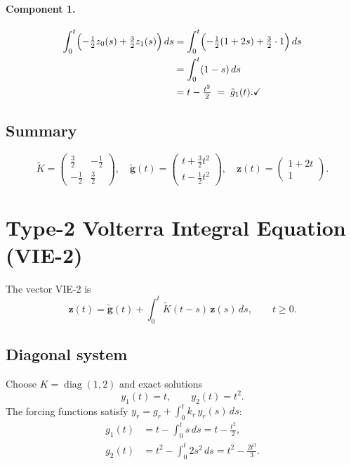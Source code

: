 \documentclass[11pt]{article}
\begin{document}
\paragraph{Component 1.}
\begin{align*}
  \int_0^t \Bigl(-\tfrac{1}{2}z_0(s) + \tfrac{3}{2}z_1(s)\Bigr)\,ds
  &= \int_0^t \Bigl(-\tfrac{1}{2}(1+2s) + \tfrac{3}{2}\cdot 1\Bigr)\,ds \\
  &= \int_0^t (1-s)\,ds \\
  &= t - \tfrac{t^2}{2} \;=\; \tilde{g}_1(t). \checkmark
\end{align*}

\subsection*{Summary}
\[
  \boxed{
    \widetilde{K} = \begin{pmatrix}\tfrac{3}{2}&-\tfrac{1}{2}\\-\tfrac{1}{2}&\tfrac{3}{2}\end{pmatrix},
    \quad
    \widetilde{\mathbf{g}}(t) = \begin{pmatrix}t+\tfrac{3}{2}t^2\\t-\tfrac{1}{2}t^2\end{pmatrix},
    \quad
    \mathbf{z}(t) = \begin{pmatrix}1+2t\\1\end{pmatrix}.
  }
\]

\section{Type-2 Volterra Integral Equation (VIE-2)}

The vector VIE-2 is
\[
  \mathbf{z}(t) = \widetilde{\mathbf{g}}(t)
                + \int_0^t \widetilde{K}(t-s)\,\mathbf{z}(s)\,ds,
  \qquad t\ge 0.
\]

\subsection*{Diagonal system}

Choose $K = \operatorname{diag}(1,2)$ and exact solutions
\[
  y_1(t) = t, \qquad y_2(t) = t^2.
\]
The forcing functions satisfy $y_r = g_r + \int_0^t k_r\,y_r(s)\,ds$:
\begin{align*}
  g_1(t) &= t - \int_0^t s\,ds = t - \tfrac{t^2}{2}, \\[4pt]
  g_2(t) &= t^2 - \int_0^t 2s^2\,ds = t^2 - \tfrac{2t^3}{3}.
\end{align*}
\end{document}
